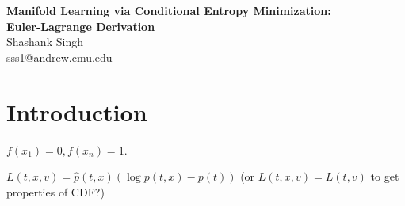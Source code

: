 \documentclass{article}
\begin{document}
\begin{center}
{\bf\Large Manifold Learning via Conditional Entropy Minimization:\\
Euler-Lagrange Derivation}\\
Shashank Singh\\
sss1@andrew.cmu.edu\\
\end{center}

\section{Introduction}

$f(x_1) = 0,f(x_n) = 1$.

$L(t,x,v) = \hat p(t,x) \left( \log p(t,x) - p(t) \right)$
(or $L(t,x,v) = L(t,v)$ to get properties of CDF?)

%
%
\end{document}

